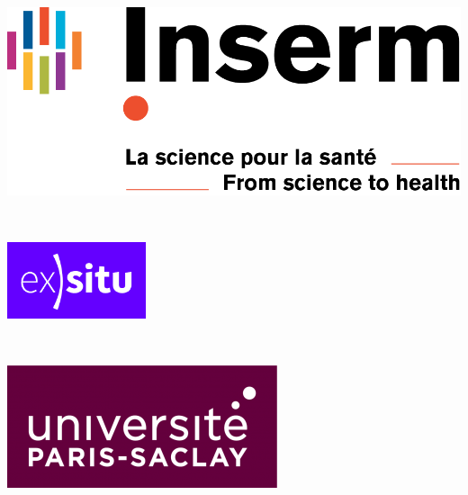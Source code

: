 \documentclass[11pt, a4paper]{article}
\begin{document}
\begin{gridlayout}{\textwidth}{5cm}
\begin{row}{0.5}
        \begin{cell}{0.25}
            \centering
            \includegraphics[width=\cellwidth, height=\rowheight, keepaspectratio]{img/logo-inserm.png}
        \end{cell}
    \end{row}
    \begin{row}{0.5}
        \begin{cell}{0.1}
            ~ %
        \end{cell}
        \begin{cell}{0.25}
            \centering
            \includegraphics[width=\cellwidth, height=\rowheight, keepaspectratio]{img/logo-ex-situ.png}
        \end{cell}
        \begin{cell}{0.3}
            ~ %
        \end{cell}
        \begin{cell}{0.25}
            \centering
            \includegraphics[width=\cellwidth, height=\rowheight, keepaspectratio]{img/logo-univ-ps.png}
        \end{cell}
        \begin{cell}{0.1}
            ~ %
        \end{cell}
    \end{row}
\end{gridlayout}
\end{document}

